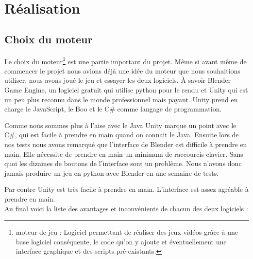 \documentclass[a4paper,11pt]{myreport}
\begin{document}
\chapter{Réalisation}

\section{Choix du moteur}
\par Le choix du moteur\footnote{moteur de jeu : Logiciel permettant de réaliser des jeux vidéos grâce à une base logiciel conséquente, le code qu'on y ajoute et éventuellement une interface graphique et des scripts pré-existants.} est une partie important du projet. Même si avant même de commencer le projet nous avions déjà une idée du moteur que nous souhaitions utiliser, nous avons joué le jeu et essayer les deux logiciels. \`A savoir Blender Game Engine, un logiciel gratuit qui utilise python pour le rendu et Unity qui est un peu plus reconnu dans le monde professionnel mais payant. Unity prend en charge le JavaScript, le Boo et le C\# comme langage de programmation.

\par Comme nous sommes plus à l'aise avec le Java Unity marque un point avec le C\#, qui est facile à prendre en main quand on connait le Java. Ensuite lors de nos tests nous avons remarqué que l'interface de Blender est difficile à prendre en main. Elle nécessite de prendre en main un minimum de raccourcis clavier. Sans quoi les dizaines de boutons de l'interface sont un problème. Nous n'avons donc jamais produire un jeu en python avec Blender en une semaine de tests.
\par Par contre Unity est très facile à prendre en main. L'interface est assez agréable à prendre en main.\\Au final voici la liste des avantages et inconvénients de chacun des deux logiciels :
\end{document}

